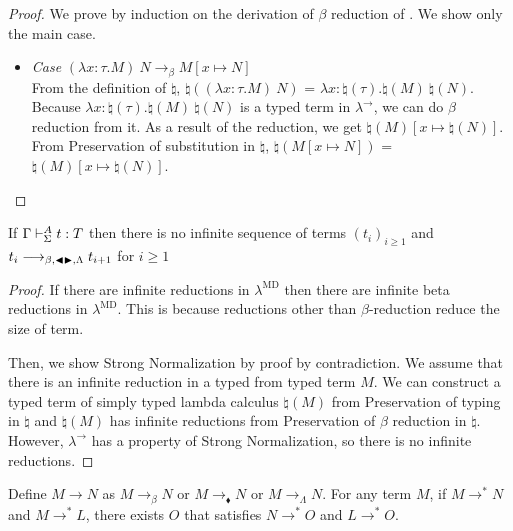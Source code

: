 \begin{proof}
We prove by induction on the derivation of $\beta$ reduction of \LMD.
We show only the main case.
\begin{itemize}
	\newcommand{\R}{\longrightarrow_{\beta}}
	\item \textit{Case} $(\lambda x:\tau.M)\ N \R M[x \mapsto N]$\\
		  From the definition of $\natural$, 
		  $\natural((\lambda x:\tau.M)\ N)$ = $\lambda x:\natural(\tau).\natural(M)\ \natural(N)$.
		  Because $\lambda x:\natural(\tau).\natural(M)\ \natural(N)$ is a typed term in $\lambda^\to$, 
		  we can do $\beta$ reduction from it.
	      As a result of the reduction, we get $\natural(M)[x\mapsto\natural(N)]$.
	      From Preservation of substitution in $\natural$, $\natural(M[x \mapsto N])$ = $\natural(M)[x\mapsto\natural(N)]$.
\end{itemize}
\end{proof}
	
\begin{theorem}
	If $\Gamma\vdash_\Sigma^A t:T$ then there is no infinite sequence of terms $(t_i)_{i\ge1}$ and $t_i \longrightarrow_{\beta, {\mathop{\blacktriangleleft}} {\mathop{\blacktriangleright}},\Lambda} t_{i+1}$ for $i\ge 1$
\end{theorem}

\begin{proof}
If there are infinite reductions in $\lambda^{\text{MD}}$ 
then there are infinite beta reductions in $\lambda^{\text{MD}}$.
This is because reductions other than $\beta$-reduction reduce the size of term.
	
Then, we show Strong Normalization by proof by contradiction.
We assume that there is an infinite reduction in a typed \LMD from typed term $M$.
We can construct a typed term of simply typed lambda calculus $\natural(M)$ from Preservation of typing in $\natural$ and
$\natural(M)$ has infinite reductions from Preservation of $\beta$ reduction in $\natural$.
However, $\lambda^\to$ has a property of Strong Normalization, so there is no infinite reductions.
\end{proof}
	
\begin{theorem}
	Define $M \longrightarrow N$ as $M \longrightarrow_{\beta} N$ or $M\longrightarrow_\blacklozenge N$ or  $M \longrightarrow_{\Lambda} N$.
	For any term $M$, if $M \longrightarrow^* N$ and $M \longrightarrow^* L$,
	there exists $O$ that satisfies $N \longrightarrow^* O$ and $L \longrightarrow^* O$.
\end{theorem}
	
